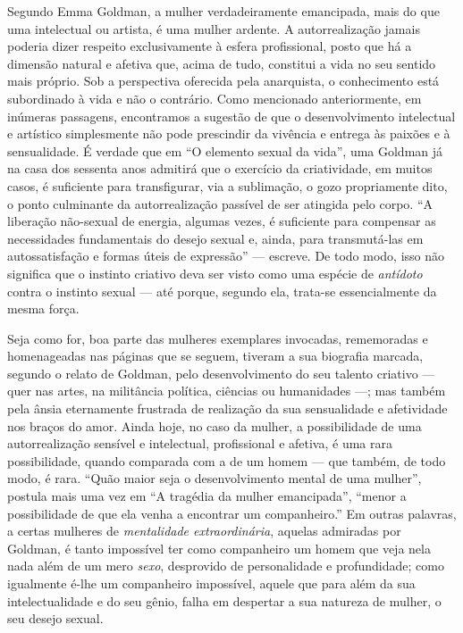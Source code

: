 Segundo Emma Goldman, a mulher verdadeiramente emancipada, mais do que
uma intelectual ou artista, é uma mulher ardente. A autorrealização
jamais poderia dizer respeito exclusivamente à esfera profissional,
posto que há a dimensão natural e afetiva que, acima de tudo, constitui
a vida no seu sentido mais próprio. Sob a perspectiva oferecida pela
anarquista, o conhecimento está subordinado à vida e não o contrário.
Como mencionado anteriormente, em inúmeras passagens, encontramos a
sugestão de que o desenvolvimento intelectual e artístico simplesmente
não pode prescindir da vivência e entrega às paixões e à sensualidade. É
verdade que em ``O elemento sexual da vida'', uma Goldman já na casa dos
sessenta anos admitirá que o exercício da criatividade, em muitos
casos, é suficiente para transfigurar, via a sublimação, o gozo
propriamente dito, o ponto culminante da autorrealização passível de ser
atingida pelo corpo. ``A liberação não-sexual de energia, algumas vezes,
é suficiente para compensar as necessidades fundamentais do desejo
sexual e, ainda, para transmutá-las em autossatisfação e formas úteis de
expressão'' --- escreve. De todo modo, isso não significa que o instinto
criativo deva ser visto como uma espécie de \textit{antídoto} contra o
instinto sexual --- até porque, segundo ela, trata-se essencialmente da
mesma força. 

Seja como for, boa parte das mulheres exemplares invocadas,
rememoradas e homenageadas nas páginas que se seguem, tiveram a sua
biografia marcada, segundo o relato de Goldman, pelo desenvolvimento do
seu talento criativo --- quer nas artes, na militância política, ciências
ou humanidades ---; mas também pela ânsia eternamente frustrada de
realização da sua sensualidade e afetividade nos braços do amor. Ainda
hoje, no caso da mulher, a possibilidade de uma autorrealização sensível
e intelectual, profissional e afetiva, é uma rara possibilidade, quando
comparada com a de um homem --- que também, de todo modo, é rara. ``Quão
maior seja o desenvolvimento mental de uma mulher'', postula mais uma
vez em ``A tragédia da mulher emancipada'', ``menor a possibilidade de
que ela venha a encontrar um companheiro.'' Em outras palavras, a certas
mulheres de \textit{mentalidade extraordinária}, aquelas admiradas por
Goldman, é tanto impossível ter como companheiro um homem que veja nela
nada além de um mero \textit{sexo}, desprovido de personalidade e
profundidade; como igualmente é-lhe um companheiro impossível, aquele
que para além da sua intelectualidade e do seu gênio, falha em despertar
a sua natureza de mulher, o seu desejo sexual. 

